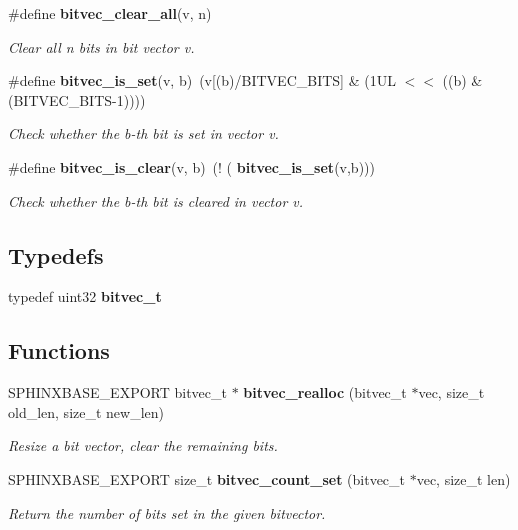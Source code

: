 \begin{DoxyCompactItemize}
\#define \textbf{ bitvec\+\_\+clear\+\_\+all}(v,  n)
\begin{DoxyCompactList}\small\item\em Clear all n bits in bit vector v. \end{DoxyCompactList}\item 
\#define \textbf{ bitvec\+\_\+is\+\_\+set}(v,  b)~(v[(b)/B\+I\+T\+V\+E\+C\+\_\+\+B\+I\+TS] \& (1\+U\+L $<$$<$ ((b) \& (\+B\+I\+T\+V\+E\+C\+\_\+\+B\+I\+T\+S-\/1))))
\begin{DoxyCompactList}\small\item\em Check whether the b-\/th bit is set in vector v. \end{DoxyCompactList}\item 
\#define \textbf{ bitvec\+\_\+is\+\_\+clear}(v,  b)~(! (\textbf{ bitvec\+\_\+is\+\_\+set}(v,b)))
\begin{DoxyCompactList}\small\item\em Check whether the b-\/th bit is cleared in vector v. \end{DoxyCompactList}\end{DoxyCompactItemize}
\subsection*{Typedefs}
\begin{DoxyCompactItemize}
\item 
\mbox{\label{bitvec_8h_ade0d20aa7e2ccec4e6fcf06419251f71}} 
typedef uint32 {\bfseries bitvec\+\_\+t}
\end{DoxyCompactItemize}
\subsection*{Functions}
\begin{DoxyCompactItemize}
\item 
\mbox{\label{bitvec_8h_a617e9fca97ca02a5e959f989c5c1a4e4}} 
S\+P\+H\+I\+N\+X\+B\+A\+S\+E\+\_\+\+E\+X\+P\+O\+RT bitvec\+\_\+t $\ast$ \textbf{ bitvec\+\_\+realloc} (bitvec\+\_\+t $\ast$vec, size\+\_\+t old\+\_\+len, size\+\_\+t new\+\_\+len)
\begin{DoxyCompactList}\small\item\em Resize a bit vector, clear the remaining bits. \end{DoxyCompactList}\item 
S\+P\+H\+I\+N\+X\+B\+A\+S\+E\+\_\+\+E\+X\+P\+O\+RT size\+\_\+t \textbf{ bitvec\+\_\+count\+\_\+set} (bitvec\+\_\+t $\ast$vec, size\+\_\+t len)
\begin{DoxyCompactList}\small\item\em Return the number of bits set in the given bitvector. \end{DoxyCompactList}\end{DoxyCompactItemize}


